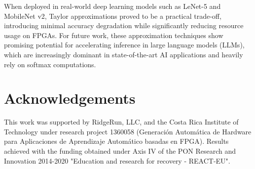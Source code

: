 \documentclass[conference]{IEEEtran}
\begin{document}
When deployed in real-world deep learning models such as LeNet-5 and MobileNet v2, Taylor approximations proved to be a practical trade-off, introducing minimal accuracy degradation while significantly reducing resource usage on FPGAs. For future work, these approximation techniques show promising potential for accelerating inference in large language models (LLMs), which are increasingly dominant in state-of-the-art AI applications and heavily rely on softmax computations.

\section*{Acknowledgements}
This work was supported by RidgeRun, LLC, and the Costa Rica Institute of Technology under research project 1360058 (Generación Automática de Hardware para Aplicaciones de Aprendizaje Automático basadas en FPGA). Results achieved with the funding obtained under Axis IV of the PON Research and Innovation 2014-2020 "Education and research for recovery - REACT-EU".




\end{document}
